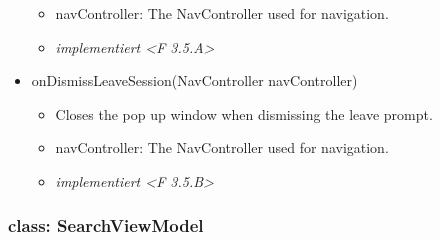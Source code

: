 \documentclass[oneside, ngerman]{sdqtechreport}
\begin{document}
\begin{itemize}
\begin{itemize}
            \item navController: The NavController used for navigation.
            \item \textit{implementiert <F 3.5.A>}
        \end{itemize}
    \item onDismissLeaveSession(NavController navController)
        \begin{itemize}
            \item Closes the pop up window when dismissing the leave prompt.
            \item navController: The NavController used for navigation.
            \item \textit{implementiert <F 3.5.B>}
        \end{itemize}
\end{itemize}



\subsubsection{class: SearchViewModel}
\end{document}
